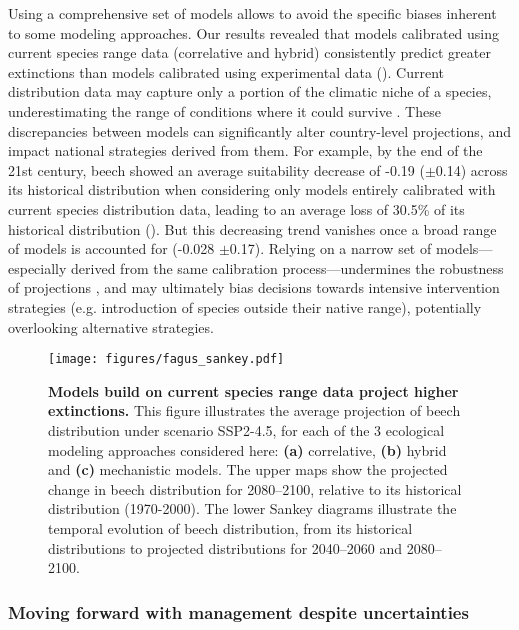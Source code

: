 \documentclass[11pt,letter]{article}
\begin{document}
Using a comprehensive set of models allows to avoid the specific biases inherent to some modeling approaches. Our results revealed that models calibrated using current species range data (correlative and hybrid) consistently predict greater extinctions than models calibrated using experimental data (). 
Current distribution data may capture only a portion of the climatic niche of a species, underestimating the range of conditions where it could survive \citep{Chevalier2024, NoguesBravo2016}.
These discrepancies between models can significantly alter country-level projections, and impact national strategies derived from them. 
For example, by the end of the 21st century, beech showed an average suitability decrease of -0.19 ($\pm$0.14) across its historical distribution when considering only models entirely calibrated with current species distribution data, leading to an average loss of 30.5\% of its historical distribution (). But this decreasing trend vanishes once a broad range of models is accounted for (-0.028 $\pm$0.17).
Relying on a narrow set of models---especially derived from the same calibration process---undermines the robustness of projections \citep{Dawson2011}, and may ultimately bias decisions towards intensive intervention strategies (e.g. introduction of species outside their native range), potentially overlooking alternative strategies.

\begin{figure}
	\centering
	\texttt{[image: figures/fagus\_sankey.pdf]}
	\caption{\textbf{Models build on current species range data project higher extinctions.} This figure illustrates the average projection of beech distribution under scenario SSP2-4.5, for each of the 3 ecological modeling approaches considered here: \textbf{(a)} correlative, \textbf{(b)} hybrid and \textbf{(c)} mechanistic models. The upper maps show the projected change in beech distribution for 2080–2100, relative to its historical distribution (1970-2000). The lower Sankey diagrams illustrate the temporal evolution of beech distribution, from its historical distributions to projected distributions for 2040–2060 and 2080–2100.}
	\label{fig:diffproj}
\end{figure}

\subsubsection*{Moving forward with management despite uncertainties}
\end{document}
